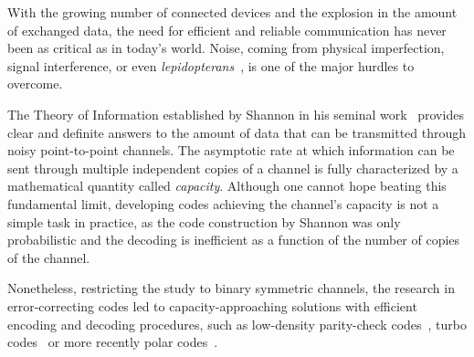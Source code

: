 
With the growing number of connected devices and the explosion in the amount of exchanged data, the need for efficient and reliable communication has never been as critical as in today's world. Noise, coming from physical imperfection, signal interference, or even \emph{lepidopterans}~\cite{Hopper81}, is one of the major hurdles to overcome.

The Theory of Information established by Shannon in his seminal work~\cite{Shannon48} provides clear and definite answers to the amount of data that can be transmitted through noisy point-to-point channels. The asymptotic rate at which information can be sent through multiple independent copies of a channel is fully characterized by a mathematical quantity called \emph{capacity}. Although one cannot hope beating this fundamental limit, developing codes achieving the channel's capacity is not a simple task in practice, as the code construction by Shannon was only probabilistic and the decoding is inefficient as a function of the number of copies of the channel.

Nonetheless, restricting the study to binary symmetric channels, the research in error-correcting codes led to capacity-approaching solutions with efficient encoding and decoding procedures, such as low-density parity-check codes~\cite{Gallager62}, turbo codes~\cite{BG96} or more recently polar codes~\cite{Arikan09}.

